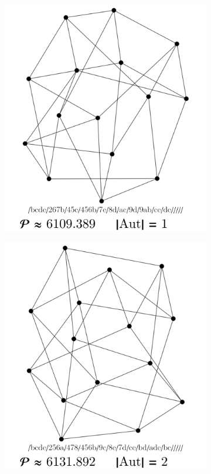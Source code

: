 \documentclass[12pt,a4paper]{article}
\renewcommand{\|}{\rule[-0.4ex]{0.2ex}{1.2em}}
\begin{document}
\begin{figure}[htb]
\begin{subfigure}[b]{.24 \textwidth}
		\subcaption{}
	\end{subfigure}
	\begin{subfigure}[b]{.24 \textwidth}
		\includegraphics[width=\linewidth]{smallest_13_3}
		\subcaption{}
	\end{subfigure}
	\begin{subfigure}[b]{.24 \textwidth}
		\includegraphics[width=\linewidth]{smallest_13_4}
		\subcaption{}
	\end{subfigure}
	

\end{figure}
\end{document}
